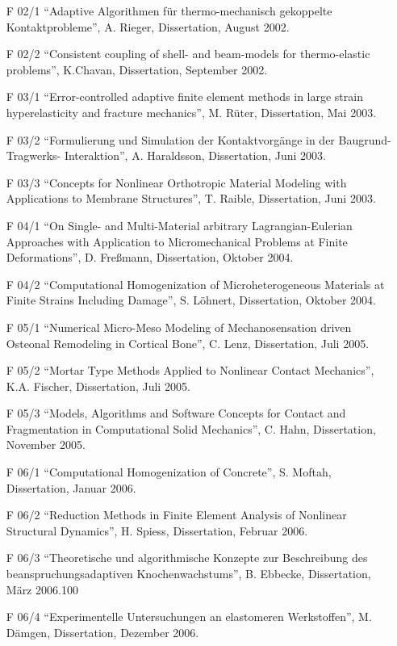 \begin{itemize}
    \item[F 02/1] ``Adaptive Algorithmen für thermo-mechanisch gekoppelte Kontaktprobleme”, A. Rieger, Dissertation, August 2002.
    \item[F 02/2] ``Consistent coupling of shell- and beam-models for thermo-elastic problems”, K.Chavan, Dissertation, September 2002.
    \item[F 03/1] ``Error-controlled adaptive finite element methods in large strain hyperelasticity and fracture mechanics”, M. Rüter, Dissertation, Mai 2003.
    \item[F 03/2] ``Formulierung und Simulation der Kontaktvorgänge in der Baugrund- Tragwerks- Interaktion”, A. Haraldsson, Dissertation, Juni 2003.
    \item[F 03/3] ``Concepts for Nonlinear Orthotropic Material Modeling with Applications to Membrane Structures”, T. Raible, Dissertation, Juni 2003.
    \item[F 04/1] ``On Single- and Multi-Material arbitrary Lagrangian-Eulerian Approaches with Application to Micromechanical Problems at Finite Deformations”, D. Freßmann, Dissertation, Oktober 2004.
    \item[F 04/2] ``Computational Homogenization of Microheterogeneous Materials at Finite Strains Including Damage”, S. Löhnert, Dissertation, Oktober 2004.
    \item[F 05/1] ``Numerical Micro-Meso Modeling of Mechanosensation driven Osteonal Remodeling in Cortical Bone”, C. Lenz, Dissertation, Juli 2005.
    \item[F 05/2] ``Mortar Type Methods Applied to Nonlinear Contact Mechanics”, K.A. Fischer, Dissertation, Juli 2005.
    \item[F 05/3] ``Models, Algorithms and Software Concepts for Contact and Fragmentation in Computational Solid Mechanics”, C. Hahn, Dissertation, November 2005.
    \item[F 06/1] ``Computational Homogenization of Concrete”, S. Moftah, Dissertation, Januar 2006.
    \item[F 06/2] ``Reduction Methods in Finite Element Analysis of Nonlinear Structural Dynamics”, H. Spiess, Dissertation, Februar 2006.
    \item[F 06/3] ``Theoretische und algorithmische Konzepte zur Beschreibung des beanspruchungsadaptiven Knochenwachstums”, B. Ebbecke, Dissertation, März 2006.100
    \item[F 06/4] ``Experimentelle Untersuchungen an elastomeren Werkstoffen”, M. Dämgen, Dissertation, Dezember 2006.

\end{itemize}
